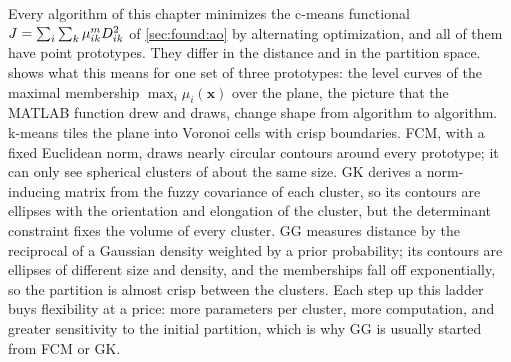 Every algorithm of this chapter minimizes the c-means functional $J=\sum_i\sum_k\mu_{ik}^mD^2_{ik}$ of \cref{sec:found:ao} by alternating optimization, and all of them have point prototypes. They differ in the distance and in the partition space.  shows what this means for one set of three prototypes: the level curves of the maximal membership $\max_i\mu_i(\mathbf{x})$ over the plane, the picture that the MATLAB function  drew and  draws, change shape from algorithm to algorithm. k-means tiles the plane into Voronoi cells with crisp boundaries. FCM, with a fixed Euclidean norm, draws nearly circular contours around every prototype; it can only see spherical clusters of about the same size. GK derives a norm-inducing matrix from the fuzzy covariance of each cluster, so its contours are ellipses with the orientation and elongation of the cluster, but the determinant constraint fixes the volume of every cluster. GG measures distance by the reciprocal of a Gaussian density weighted by a prior probability; its contours are ellipses of different size and density, and the memberships fall off exponentially, so the partition is almost crisp between the clusters. Each step up this ladder buys flexibility at a price: more parameters per cluster, more computation, and greater sensitivity to the initial partition, which is why GG is usually started from FCM or GK.

